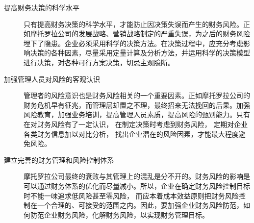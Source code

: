 \documentclass{ctexart}
\begin{document}
\begin{description}
	\item[提高财务决策的科学水平]只有提高财务决策的科学水平，才能防止因决策失误而产生的财务风险。正如摩托罗拉公司的发展战略、营销战略制定的严重失误，为之后的财务风险埋下了隐患。企业必须采用科学的决策方法。在决策过程中，应充分考虑影响决策的各种因素，尽量采用定量计算及分析方法，并运用科学的决策模型进行决策，对各种可行方案决策，切忌主观臆断。\cite{孙新宇2016企业财务风险识别与防范案例分析}
	\item[加强管理人员对风险的客观认识]管理者的风险意识也是财务风险相关的一个重要因素。正如摩托罗拉公司的财务危机早有征兆，而管理层却置之不理，最终招来无法挽回的后果。加强风险教育，加强业务培训，提高管理人员素质，提高风险的甄别能力。只有在对财务风险有了一定认识， 在制定决策时考虑到财务风险， 定期对企业各类财务信息加以对比分析， 找出企业潜在的风险因素，才能最大程度避免风险。
	\item[建立完善的财务管理和风险控制体系]摩托罗拉公司最终的衰败与其管理上的混乱是分不开的。财务风险的影响是可以通过财务体系的优化而尽量减小。所以，企业在确定财务风险控制目标时不能一味追求低风险甚至零风险， 而应本着成本效益原则把财务风险控制在一个合理的、可接受的范围之内。因此，要加强企业财务风险防范，如何防范企业财务风险，化解财务风险，以实现财务管理目标。\cite{赵军2011浅谈财务风险分析与防范}
\end{description}




\end{document}
